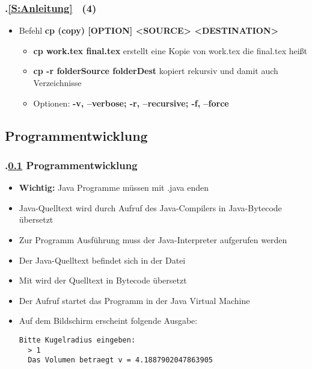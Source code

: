 \begin{frame}[t]%
\frametitle{\kap.\ref{S:Anleitung} \stitle\ (4)}%

\begin{itemize}
  \setlength{\itemsep}{4pt}
  \item Befehl \textbf{cp (copy) [OPTION] <SOURCE> <DESTINATION>}
  \begin{itemize}
    \setlength{\itemsep}{2pt}
    \item \textbf{cp work.tex final.tex} erstellt eine Kopie von work.tex die final.tex hei\ss t
    \item \textbf{cp -r folderSource folderDest} kopiert rekursiv und damit auch Verzeichnisse
    \item Optionen: \textbf{-v, --verbose; -r, --recursive; -f, --force}
  \end{itemize}
\end{itemize}
\end{frame}


\def\stitle{Programmentwicklung}%
\subsection{\stitle}\label{S:Progentw}
\begin{frame}[fragile]%
\frametitle{\kap.\ref{S:Progentw} \stitle}%

\begin{itemize}
  \item \textbf{Wichtig:} Java Programme müssen mit .java enden
  \item Java-Quelltext wird durch Aufruf des Java-Compilers in Java-Bytecode übersetzt 
  \item Zur Programm Ausführung muss der Java-Interpreter aufgerufen werden 
\end{itemize}

\begin{itemize}
  \item Der Java-Quelltext befindet sich in der Datei 
  \item Mit  wird der Quelltext in Bytecode übersetzt
  \item Der Aufruf  startet das Programm in der Java Virtual Machine
  \item Auf dem Bildschirm erscheint folgende Ausgabe:
  \begin{lstlisting}[style=bash]
  Bitte Kugelradius eingeben:
  > 1
  Das Volumen betraegt v = 4.1887902047863905
  \end{lstlisting}
\end{itemize}
\end{frame}
